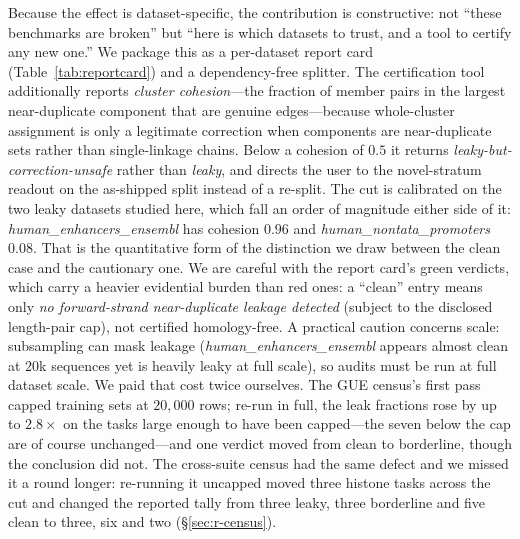 \documentclass[webpdf,modern,large,namedate]{oup-authoring-template}%
\begin{document}
Because the effect is dataset-specific, the contribution is constructive: not ``these benchmarks are broken'' but ``here is which datasets to trust, and a tool to certify any new one.'' We package this as a per-dataset report card (Table~\ref{tab:reportcard}) and a dependency-free splitter. The certification tool additionally reports \emph{cluster cohesion}---the fraction of member pairs in the largest near-duplicate component that are genuine edges---because whole-cluster assignment is only a legitimate correction when components are near-duplicate sets rather than single-linkage chains. Below a cohesion of $0.5$ it returns \emph{leaky-but-correction-unsafe} rather than \emph{leaky}, and directs the user to the novel-stratum readout on the as-shipped split instead of a re-split. The cut is calibrated on the two leaky datasets studied here, which fall an order of magnitude either side of it: \textit{human\_enhancers\_ensembl} has cohesion $0.96$ and \textit{human\_nontata\_promoters} $0.08$. That is the quantitative form of the distinction we draw between the clean case and the cautionary one. We are careful with the report card's green verdicts, which carry a heavier evidential burden than red ones: a ``clean'' entry means only \emph{no forward-strand near-duplicate leakage detected} (subject to the disclosed length-pair cap), not certified homology-free. A practical caution concerns scale: subsampling can mask leakage (\textit{human\_enhancers\_ensembl} appears almost clean at $20$k sequences yet is heavily leaky at full scale), so audits must be run at full dataset scale. We paid that cost twice ourselves. The GUE census's first pass capped training sets at $20{,}000$ rows; re-run in full, the leak fractions rose by up to $2.8\times$ on the tasks large enough to have been capped---the seven below the cap are of course unchanged---and one verdict moved from clean to borderline, though the conclusion did not. The cross-suite census had the same defect and we missed it a round longer: re-running it uncapped moved three histone tasks across the cut and changed the reported tally from three leaky, three borderline and five clean to three, six and two (\S\ref{sec:r-census}).
\end{document}
